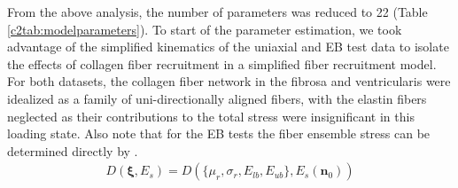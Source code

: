     From the above analysis, the number of parameters was reduced to 22 (Table \ref{c2tab:modelparameters}). To start of the parameter estimation, we took advantage of the simplified kinematics of the uniaxial and EB test data to isolate the effects of collagen fiber recruitment in a simplified fiber recruitment model. For both datasets, the collagen fiber network in the fibrosa and ventricularis were idealized as a family of uni-directionally aligned fibers, with the elastin fibers neglected as their contributions to the total stress were insignificant in this loading state. Also note that for the EB tests the fiber ensemble stress can be determined directly by \cite{sacks_biaxial_2000}.
        \begin{equation}\label{c2eqn:ensembleform}
        \begin{aligned}
        D(\mathbf{\xi},E_s) = D(\{\mu_r, \sigma_r, E_{lb}, E_{ub}\}, E_s(\mathbf{n}_0))
        \end{aligned}
        \end{equation}
    
    
    
    
    